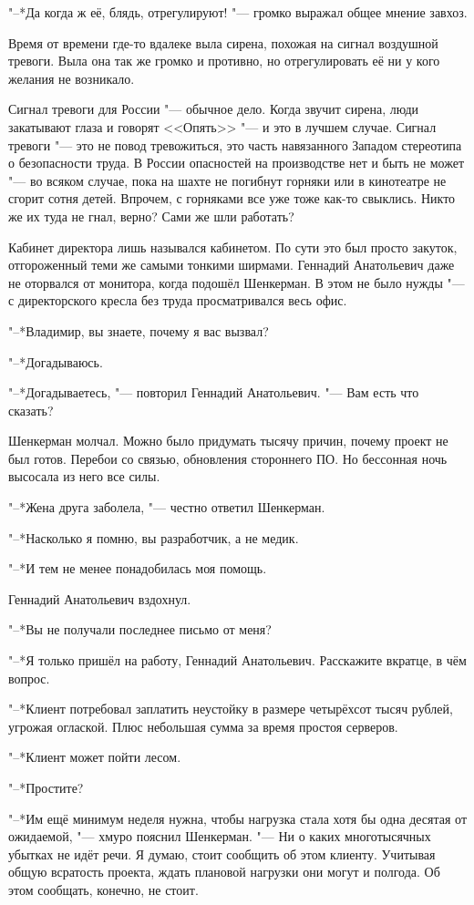 "--*Да когда ж её, блядь, отрегулируют! "--- громко выражал общее мнение завхоз.

Время от времени где-то вдалеке выла сирена, похожая на сигнал воздушной тревоги.
Выла она так же громко и противно, но отрегулировать её ни у кого желания не возникало.

Сигнал тревоги для России "--- обычное дело.
Когда звучит сирена, люди закатывают глаза и говорят <<Опять>> "--- и это в лучшем случае.
Сигнал тревоги "--- это не повод тревожиться, это часть навязанного Западом стереотипа о безопасности труда.
В России опасностей на производстве нет и быть не может "--- во всяком случае, пока на шахте не погибнут горняки или в кинотеатре не сгорит сотня детей.
Впрочем, с горняками все уже тоже как-то свыклись.
Никто же их туда не гнал, верно?
Сами же шли работать?

Кабинет директора лишь назывался кабинетом.
По сути это был просто закуток, отгороженный теми же самыми тонкими ширмами.
Геннадий Анатольевич даже не оторвался от монитора, когда подошёл Шенкерман.
В этом не было нужды "--- с директорского кресла без труда просматривался весь офис.

"--*Владимир, вы знаете, почему я вас вызвал?

"--*Догадываюсь.

"--*Догадываетесь, "--- повторил Геннадий Анатольевич.
"--- Вам есть что сказать?

Шенкерман молчал.
Можно было придумать тысячу причин, почему проект не был готов.
Перебои со связью, обновления стороннего ПО.
Но бессонная ночь высосала из него все силы.

"--*Жена друга заболела, "--- честно ответил Шенкерман.

"--*Насколько я помню, вы разработчик, а не медик.

"--*И тем не менее понадобилась моя помощь.

Геннадий Анатольевич вздохнул.

"--*Вы не получали последнее письмо от меня?

"--*Я только пришёл на работу, Геннадий Анатольевич.
Расскажите вкратце, в чём вопрос.

"--*Клиент потребовал заплатить неустойку в размере четырёхсот тысяч рублей, угрожая оглаской.
Плюс небольшая сумма за время простоя серверов.

"--*Клиент может пойти лесом.

"--*Простите?

"--*Им ещё минимум неделя нужна, чтобы нагрузка стала хотя бы одна десятая от ожидаемой, "--- хмуро пояснил Шенкерман.
"--- Ни о каких многотысячных убытках не идёт речи.
Я думаю, стоит сообщить об этом клиенту.
Учитывая общую всратость проекта, ждать плановой нагрузки они могут и полгода.
Об этом сообщать, конечно, не стоит.

